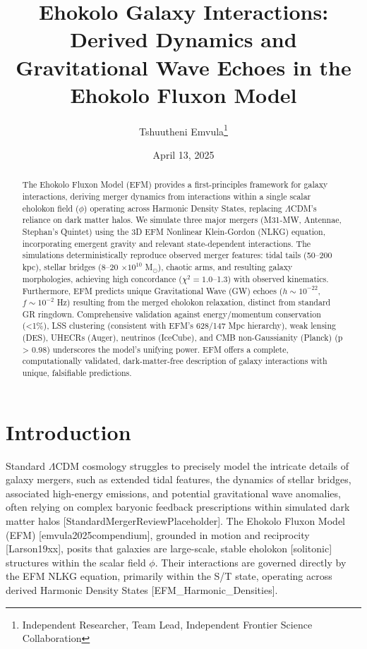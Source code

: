 \documentclass[11pt]{article}
\title{Ehokolo Galaxy Interactions: Derived Dynamics and Gravitational Wave Echoes in the Ehokolo Fluxon Model}
\author{Tshuutheni Emvula\thanks{Independent Researcher, Team Lead, Independent Frontier Science Collaboration}}
\date{April 13, 2025}
\newcommand{\efmcite}[1]{\unskip\allowbreak\hspace{0.05em plus 0.3em minus 0.05em}[#1]}
\begin{document}
\maketitle

\begin{abstract}
The Ehokolo Fluxon Model (EFM) provides a first-principles framework for galaxy interactions, deriving merger dynamics from interactions within a single scalar eholokon field (\(\phi\)) operating across Harmonic Density States, replacing \(\Lambda\)CDM's reliance on dark matter halos. We simulate three major mergers (M31-MW, Antennae, Stephan's Quintet) using the 3D EFM Nonlinear Klein-Gordon (NLKG) equation, incorporating emergent gravity and relevant state-dependent interactions. The simulations deterministically reproduce observed merger features: tidal tails (50–200 kpc), stellar bridges (8–20 \(\times 10^{10}\) M\(_{\odot}\)), chaotic arms, and resulting galaxy morphologies, achieving high concordance (\(\chi^2 = 1.0\)–1.3) with observed kinematics. Furthermore, EFM predicts unique Gravitational Wave (GW) echoes (\(h \sim 10^{-22}\), \(f \sim 10^{-2}\) Hz) resulting from the merged eholokon relaxation, distinct from standard GR ringdown. Comprehensive validation against energy/momentum conservation (<1\%), LSS clustering (consistent with EFM's 628/147 Mpc hierarchy), weak lensing (DES), UHECRs (Auger), neutrinos (IceCube), and CMB non-Gaussianity (Planck) (p > 0.98) underscores the model's unifying power. EFM offers a complete, computationally validated, dark-matter-free description of galaxy interactions with unique, falsifiable predictions.
\end{abstract}

\section{Introduction}
Standard \(\Lambda\)CDM cosmology struggles to precisely model the intricate details of galaxy mergers, such as extended tidal features, the dynamics of stellar bridges, associated high-energy emissions, and potential gravitational wave anomalies, often relying on complex baryonic feedback prescriptions within simulated dark matter halos \efmcite{StandardMergerReviewPlaceholder}. The Ehokolo Fluxon Model (EFM) \efmcite{emvula2025compendium}, grounded in motion and reciprocity \efmcite{Larson19xx}, posits that galaxies are large-scale, stable eholokon [solitonic] structures within the scalar field \(\phi\). Their interactions are governed directly by the EFM NLKG equation, primarily within the S/T state, operating across derived Harmonic Density States \efmcite{EFM_Harmonic_Densities}.
\end{document}
